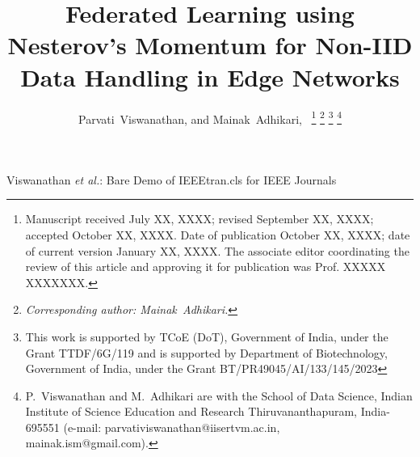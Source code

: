 \documentclass[journal]{IEEEtran}
\begin{document}


\title{Federated Learning using Nesterov's Momentum for Non-IID Data Handling in Edge Networks}

\author{Parvati~Viswanathan, and Mainak~Adhikari,~
\thanks{Manuscript received July XX, XXXX; revised September XX, XXXX; accepted October XX, XXXX. Date of publication October XX, XXXX; date of current version January XX, XXXX. The associate editor coordinating the review of this article and approving it for publication was Prof. XXXXX XXXXXXX.}
\thanks{\emph{Corresponding author: Mainak~Adhikari.}}
\thanks{This work is supported by TCoE (DoT), Government of India, under the Grant TTDF/6G/119 and is supported by Department of Biotechnology, Government of India, under the Grant BT/PR49045/AI/133/145/2023}
\thanks{P.~Viswanathan and M.~Adhikari are with the School of Data Science, Indian Institute of Science Education and Research Thiruvananthapuram, India-695551 (e-mail: parvativiswanathan@iisertvm.ac.in, mainak.ism@gmail.com).} 
}
%
{Viswanathan \MakeLowercase{\textit{et al.}}: Bare Demo of IEEEtran.cls for IEEE Journals}
\maketitle
\end{document}
